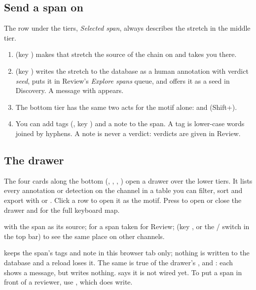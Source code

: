 \subsection{Send a span on}\label{sec:explore-send-span}
The row under the tiers, \emph{Selected span}, always describes the stretch in the middle
tier.
\begin{enumerate}
  \item {} (key ) makes that stretch the source of the chain on
     and takes you there.
  \item {} (key ) writes the stretch to the database as a human
    annotation with verdict \emph{seed}, puts it in Review's \emph{Explore spans} queue, and
    offers it as a seed in Discovery. A message with  appears.
  \item The bottom tier has the same two acts for the motif alone:  and  (Shift+).
  \item You can add tags (, key ) and a note to the span. A tag is lower-case
    words joined by hyphens. A note is never a verdict: verdicts are given in Review.
\end{enumerate}

\subsection{The drawer}\label{sec:explore-drawer}
The four cards along the bottom (, , ,
) open a drawer over the lower tiers. It lists every annotation or
detection on the channel in a table you can filter, sort and export with  or
. Click a row to open it as the motif. Press  to open or close the
drawer and  for the full keyboard map.

 with the span as its source;  for a span
taken for Review;  (key , or the  /
 switch in the top bar) to see the same place on other channels.

\begin{watchout}
 keeps the span's tags and note in this browser tab only; nothing is written
to the database and a reload loses it. The same is true of the drawer's ,  and : each shows a message, but writes nothing.
 says it is not wired yet. To put a span in front of a reviewer, use
, which does write.
\end{watchout}

